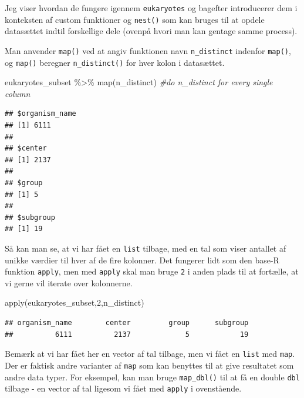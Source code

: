 \documentclass[
]{book}
\newenvironment{Shaded}{\begin{snugshade}}{\end{snugshade}}
\newcommand{\CommentTok}[1]{\textcolor[rgb]{0.56,0.35,0.01}{\textit{#1}}}
\newcommand{\DecValTok}[1]{\textcolor[rgb]{0.00,0.00,0.81}{#1}}
\newcommand{\FunctionTok}[1]{\textcolor[rgb]{0.00,0.00,0.00}{#1}}
\newcommand{\NormalTok}[1]{#1}
\newcommand{\SpecialCharTok}[1]{\textcolor[rgb]{0.00,0.00,0.00}{#1}}
\begin{document}
Jeg viser hvordan de fungere igennem \texttt{eukaryotes} og bagefter introducerer dem i konteksten af custom funktioner og \texttt{nest()} som kan bruges til at opdele datasættet indtil forskellige dele (ovenpå hvori man kan gentage samme process).

Man anvender \texttt{map()} ved at angiv funktionen navn \texttt{n\_distinct} indenfor \texttt{map()}, og \texttt{map()} beregner \texttt{n\_distinct()} for hver kolon i datasættet.

\begin{Shaded}
\begin{Highlighting}[]
\NormalTok{eukaryotes\_subset }\SpecialCharTok{\%\textgreater{}\%} \FunctionTok{map}\NormalTok{(n\_distinct) }\CommentTok{\#do \textquotesingle{}n\_distinct\textquotesingle{} for every single column}
\end{Highlighting}
\end{Shaded}

\begin{verbatim}
## $organism_name
## [1] 6111
## 
## $center
## [1] 2137
## 
## $group
## [1] 5
## 
## $subgroup
## [1] 19
\end{verbatim}

Så kan man se, at vi har fået en \texttt{list} tilbage, med en tal som viser antallet af unikke værdier til hver af de fire kolonner. Det fungerer lidt som den base-R funktion \texttt{apply}, men med \texttt{apply} skal man bruge \texttt{2} i anden plads til at fortælle, at vi gerne vil iterate over kolonnerne.

\begin{Shaded}
\begin{Highlighting}[]
\FunctionTok{apply}\NormalTok{(eukaryotes\_subset,}\DecValTok{2}\NormalTok{,n\_distinct)}
\end{Highlighting}
\end{Shaded}

\begin{verbatim}
## organism_name        center         group      subgroup 
##          6111          2137             5            19
\end{verbatim}

Bemærk at vi har fået her en vector af tal tilbage, men vi fået en \texttt{list} med \texttt{map}. Der er faktisk andre varianter af \texttt{map} som kan benyttes til at give resultatet som andre data typer. For eksempel, kan man bruge \texttt{map\_dbl()} til at få en double \texttt{dbl} tilbage - en vector af tal ligesom vi fået med \texttt{apply} i ovenstående.
\end{document}
